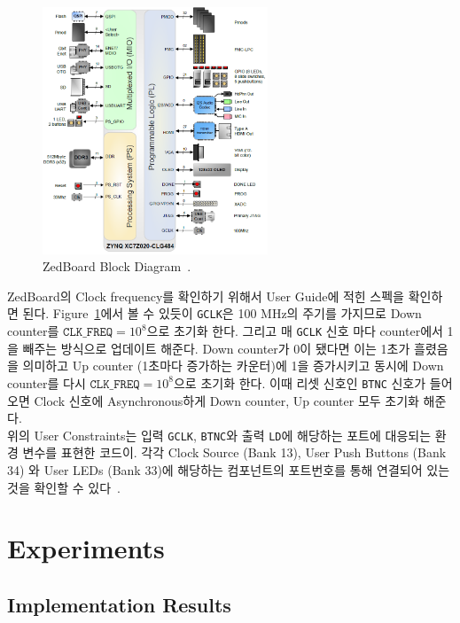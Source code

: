\documentclass{article}
\begin{document}
\begin{figure}[htb!]
	\centering
	\includegraphics[width=0.6\textwidth]{fig/fig2.png}
\caption{ZedBoard Block Diagram~\cite{UG}.}
\label{fig2}
\end{figure}

ZedBoard의 Clock frequency를 확인하기 위해서 User Guide에 적힌 스펙을 확인하면 된다. Figure~\ref{fig2}에서 볼 수 있듯이 \texttt{GCLK}은 100 MHz의 주기를 가지므로 Down counter를 $\texttt{CLK\_FREQ}=10^8$으로 초기화 한다. 그리고 매 \texttt{GCLK} 신호 마다 counter에서 1을 빼주는 방식으로 업데이트 해준다.
Down counter가 0이 됐다면 이는 1초가 흘렸음을 의미하고 Up counter (1초마다 증가하는 카운터)에 1을 증가시키고 동시에 Down counter를 다시 $\texttt{CLK\_FREQ}=10^8$으로 초기화 한다. 이때 리셋 신호인 \texttt{BTNC} 신호가 들어오면 Clock 신호에 Asynchronous하게 Down counter, Up counter 모두 초기화 해준다. \\

위의 User Constraints는 입력 \texttt{GCLK}, \texttt{BTNC}와 출력 \texttt{LD}에 해당하는 포트에 대응되는 환경 변수를 표현한 코드이. 각각 Clock Source (Bank 13), User Push Buttons (Bank 34) 와 User LEDs (Bank 33)에 해당하는 컴포넌트의 포트번호를 통해 연결되어 있는 것을 확인할 수 있다~\cite{UG}.

\newpage
\section{Experiments}

\subsection{Implementation Results}
\end{document}
